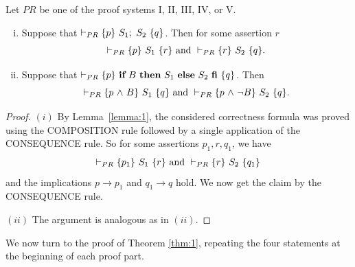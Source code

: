 \documentclass[runningheads]{llncs}       %
\begin{document}
\begin{lemma} \label{lem:useful}
Let $\mathit{PR}$ be one of the proof systems I, II, III, IV, or V.
  \begin{enumerate} [(i)] 
  \item  Suppose that  $\vdash_{PR} \HT{p}{S_1; \ S_2}{q}$.
    Then for some assertion $r$
    \[
 \vdash_{PR} \mbox{$\{{p}\}\ {S_1}\ \{{r}\}$} \mbox{ and }
 \vdash_{PR} \mbox{$\{{r}\}\ {S_2}\ \{{q}\}$}.
\]

\item Suppose that  $\vdash_{PR} \mbox{$\{{p}\}\ {\mbox{$\mbox{{\bf if}\ } {B} \mbox{\ {\bf then}\ } {S_1} \mbox{\ {\bf else}\ } {S_2}\ \mbox{{\bf fi}}$}}\ \{{q}\}$}$.
    Then 
    \[
 \vdash_{PR} \mbox{$\{{p \mbox{$\ \wedge\ $} B}\}\ {S_1}\ \{{q}\}$} \mbox{ and }
 \vdash_{PR} \mbox{$\{{p \mbox{$\ \wedge\ $} \neg B}\}\ {S_2}\ \{{q}\}$}.
\]
 \end{enumerate}    
\end{lemma}
\begin{proof}
  $(i)$ By Lemma~\ref{lemma:1}, the considered correctness formula was proved using
  the COMPOSITION rule followed by a single application of the CONSEQUENCE rule.
  So for some assertions $p_1, r, q_1$, we have
    \[
 \vdash_{PR} \mbox{$\{{p_1}\}\ {S_1}\ \{{r}\}$} \mbox{ and }
 \vdash_{PR} \mbox{$\{{r}\}\ {S_2}\ \{{q_1}\}$}
\]
and the implications $p \to p_1$ and $q_1 \to q$ hold.
We now get the claim by the CONSEQUENCE rule.
\vspace{2mm}

\NI
$(ii)$ The argument is analogous as in $(ii)$. 
\HB
\end{proof}


We now turn to the proof of Theorem \ref{thm:1}, repeating
the four statements at the beginning of each proof part.
\end{document}
